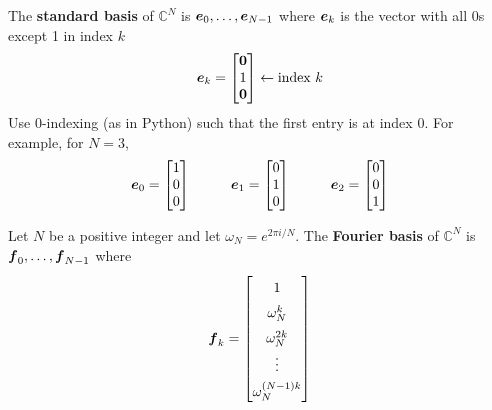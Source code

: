 \begin{definition}
The {\bf standard basis} of $\mathbb{C}^N$ is $\boldsymbol{e}_0 , \dots, \boldsymbol{e}_{N-1}$ where $\boldsymbol{e}_k$ is the vector with all 0s except 1 in index $k$
$$
\boldsymbol{e}_k = \begin{bmatrix} \boldsymbol{0} \\ 1 \\ \boldsymbol{0} \end{bmatrix} \leftarrow \text{index } k
$$
Use 0-indexing (as in Python) such that the first entry is at index 0. For example, for $N=3$,
$$
\bs{e}_0 = \begin{bmatrix} 1 \\ 0 \\ 0 \end{bmatrix} \hspace{10mm}
\bs{e}_1 = \begin{bmatrix} 0 \\ 1 \\ 0 \end{bmatrix} \hspace{10mm}
\bs{e}_2 = \begin{bmatrix} 0 \\ 0 \\ 1 \end{bmatrix}
$$
\end{definition}

\begin{definition}
Let $N$ be a positive integer and let $\omega_N = e^{2 \pi i / N}$. The {\bf Fourier basis} of $\mathbb{C}^N$ is $\boldsymbol{f}_0 , \dots, \boldsymbol{f}_{N-1}$ where
$$
\renewcommand{\arraystretch}{1.5}
\bs{f}_k = \begin{bmatrix} 1 \\ \omega^k_N \\ \omega^{2k}_N \\ \vdots \\ \omega^{(N-1)k}_N \end{bmatrix}
\renewcommand{\arraystretch}{1}
$$
\end{definition}

